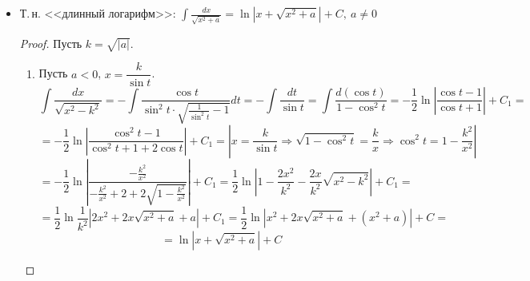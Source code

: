 \begin{itemize}
	\item Т.\,н. <<длинный логарифм>>: $\displaystyle \int \frac{dx}{\sqrt{x^2 + a}} = \ln \left| x + \sqrt{x^2 + a} \right| + C, \ a \neq 0$
	\begin{proof}
	Пусть $k = \sqrt{|a|}$.
	\begin{enumerate}
		\item Пусть $a < 0$, $x = \dfrac{k}{\sin t}$.
		\begin{equation*}
		\int \frac{dx}{\sqrt{x^2 - k^2}} =
		-\int \frac{\cos t}{\sin^2 t \cdot \sqrt{\frac1{\sin^2 t} - 1}}dt =
		-\int \frac{dt}{\sin t} =
		\int \frac{d(\cos t)}{1 - \cos^2 t} =
		-\frac12 \ln \left| \frac{\cos t - 1}{\cos t + 1} \right| + C_1 =
		\end{equation*}
		\begin{equation*}
		= -\frac12 \ln \left| \frac{\cos^2 t - 1}{\cos^2 t + 1 + 2\cos t} \right| + C_1 =
		\left| x = \frac{k}{\sin t} \Rightarrow
		\sqrt{1 - \cos^2 t} = \frac{k}x \Rightarrow
		\cos^2 t = 1 - \frac{k^2}{x^2} \right|
		\end{equation*}
		\begin{equation*}
		= -\frac12 \ln \left| \frac{-\frac{k^2}{x^2}}{-\frac{k^2}{x^2} + 2 + 2\sqrt{1 - \frac{k^2}{x^2}}} \right| + C_1 =
		\frac12 \ln \left| 1 - \frac{2x^2}{k^2} - \frac{2x}{k^2}\sqrt{x^2 - k^2} \right| + C_1 =
		\end{equation*}
		\begin{equation*}
		= \frac12 \ln \frac1{k^2} \left| 2x^2 + 2x\sqrt{x^2 + a} + a \right| + C_1 =
		\frac12 \ln \left| x^2 + 2x\sqrt{x^2 + a} + (x^2 + a) \right| + C =
		\end{equation*}
		\begin{equation*}
		= \ln \left| x + \sqrt{x^2 + a} \right| + C
		\end{equation*}
		

\end{enumerate}
\end{proof}
\end{itemize}
